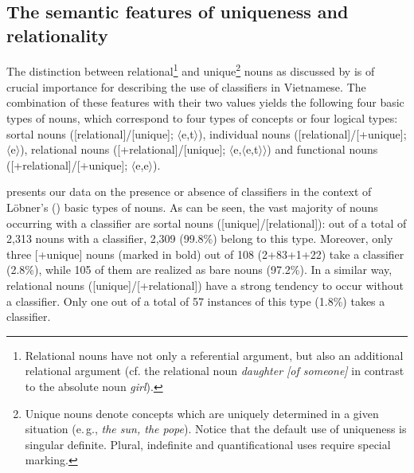 \documentclass[output=paper]{langsci/langscibook}
\begin{document}
\subsection{The semantic features of uniqueness and relationality}\label{1sec:32}

{
The distinction between {\textpm}relational\footnote{Relational
    nouns have not only a referential argument, but also an additional relational argument (cf. the relational noun {\emph{daughter [of someone]}} in contrast to the absolute noun {\emph{girl}}).
    }
 and {\textpm}unique\footnote{Unique
    nouns denote concepts which are uniquely determined in a given situation (e.\,g., {\emph{the sun, the pope}}). Notice that the default use of uniqueness is singular definite. Plural, indefinite and quantificational uses require special marking.} %
nouns as discussed by \cite{lobner:85,lobner:11} is of crucial importance for describing the use of classifiers in Vietnamese. The combination of these features with their two values yields the following four basic types of nouns, which correspond to four types of concepts or four logical types: sortal nouns ([\minus relational]/[\minus unique]; $\langle$e,t$\rangle$), individual nouns ([\minus relational]/[+unique]; $\langle$e$\rangle$), relational nouns ([+relational]/[\minus unique]; $\langle$e,$\langle$e,t$\rangle\rangle$) and functional nouns ([+relational]/[+unique]; $\langle$e,e$\rangle$).
}

{
 presents our data on the presence or absence of classifiers in the context of L\"obner's (\citeyear{lobner:85,lobner:11}) basic types of nouns. As can be seen, the vast majority of nouns occurring with a classifier are sortal nouns ([\minus unique]/[\minus relational]): out} of a total of 2,313 nouns with a classifier, 2,309 (99.8\%) belong to this type. Moreover, only three [+unique] nouns (marked in bold) out of 108 (2+83+1+22) take a classifier (2.8\%), while 105 of them are realized as bare nouns (97.2\%). In a similar way, relational nouns ([\minus unique]/[+relational]) have a strong tendency to occur without a classifier. Only one out of a total of 57 instances of this type (1.8\%) takes a classifier.
\end{document}
